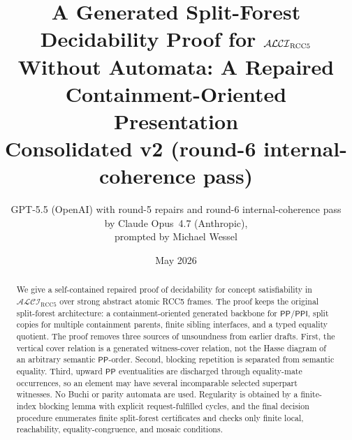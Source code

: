 \documentclass[11pt]{article}
\title{A Generated Split-Forest Decidability Proof for $\Logic$\\
       Without Automata: A Repaired Containment-Oriented Presentation\\[4pt]
       \large Consolidated v2 (round-6 internal-coherence pass)}
\author{GPT-5.5 (OpenAI) with round-5 repairs and round-6
internal-coherence pass\\ by Claude Opus~4.7 (Anthropic),\\
prompted by Michael Wessel}
\date{May 2026}
\newcommand{\Logic}{\mathcal{ALCI}_{\mathrm{RCC5}}}
\newcommand{\PP}{\mathsf{PP}}
\newcommand{\PPI}{\mathsf{PPI}}
\begin{document}
\maketitle

\begin{abstract}
We give a self-contained repaired proof of decidability for concept
satisfiability in $\Logic$ over strong abstract atomic RCC5 frames.
The proof keeps the original split-forest architecture: a
containment-oriented generated backbone for $\PP/\PPI$, split copies
for multiple containment parents, finite sibling interfaces, and a
typed equality quotient.  The proof removes three sources of
unsoundness from earlier drafts.  First, the vertical cover relation
is a generated witness-cover relation, not the Hasse diagram of an
arbitrary semantic $\PP$-order.  Second, blocking repetition is
separated from semantic equality.  Third, upward $\PP$ eventualities
are discharged through equality-mate occurrences, so an element may
have several incomparable selected superpart witnesses.  No Buchi or
parity automata are used.  Regularity is obtained by a finite-index
blocking lemma with explicit request-fulfilled cycles, and the final
decision procedure enumerates finite split-forest certificates and
checks only finite local, reachability, equality-congruence, and
mosaic conditions.


\end{abstract}
\end{document}
